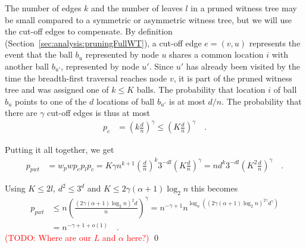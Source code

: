 \documentclass[a4paper,12pt]{article}
\newcommand\todo[1]{\textcolor{red}{(TODO: #1)}}
\begin{document}
The number of edges $k$ and the number of leaves $l$ in a pruned witness tree may be small compared to a symmetric or asymmetric witness tree, but we will use the cut-off edges to compensate. By definition (Section~\ref{sec:analysis:pruningFullWT}), a cut-off edge $e=(v, u)$ represents the event that the ball $b_u$ represented by node $u$ shares a common location $i$ with another ball $b_{u'}$, represented by node $u'$. Since $u'$ has already been visited by the time the breadth-first traversal reaches node $v$, it is part of the pruned witness tree and was assigned one of $k\leq K$ balls. The probability that location $i$ of ball $b_u$ points to one of the $d$ locations of ball $b_{u'}$ is at most $d/n$. The probability that there are $\gamma$ cut-off edges is thus at most 
\begin{align*}
p_c &= \left(k \frac{d}{n}\right)^\gamma 
    \leq \left(K \frac{d}{n}\right)^\gamma \quad .
\end{align*}

Putting it all together, we get 
\begin{align*}
p_{pwt} &= w_p w  p_e  p_l  p_c 
		= K\gamma n^{k+1} \left(\frac{d}{n}\right)^k3^{-d l}  \left(K \frac{d}{n}\right)^\gamma
		= n  d^k 3^{-d l}  \left(K^2 \frac{d}{n} \right)^\gamma \quad .
\end{align*}

Using $K \leq 2l$, $d^2 \leq 3^d$ and $K \leq 2\gamma  \left( \alpha +1 \right)  \log_2 n$ this becomes
\begin{align*}
p_{pwt} &\leq n \left(\frac{\left(2\gamma  \left(\alpha +1 \right)  \log_2 n\right)^2 d}{n}\right)^\gamma 
        = n^{-\gamma +1}  n ^{\log_n\left( \left(2\gamma \left(\alpha+1\right) \log_2n \right)^{2\gamma}  d^\gamma \right)} \\
        &= n^{-\gamma+1+o\left(1\right)} \quad .
\end{align*}
\todo{Where are our $L$ and $\alpha$ here?}
\qed
 
\end{document}

